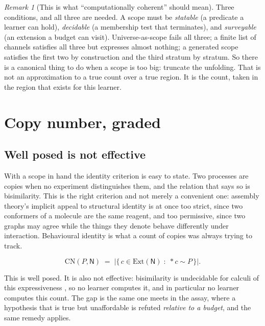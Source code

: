 \documentclass[11pt]{article}
\theoremstyle{plain}
\theoremstyle{definition}
\theoremstyle{remark}
\newtheorem{remark}[theorem]{Remark}
\newcommand{\Nsp}{\mathsf{N}}
\newcommand{\drop}[1]{*#1}
\newcommand{\CN}{\mathrm{CN}}
\newcommand{\bisim}{\sim}
\newcommand{\Ext}{\mathrm{Ext}}
\begin{document}
\begin{remark}[This is what ``computationally coherent'' should mean]
\label{sco:rem:coherent}
Three conditions, and all three are needed. A scope must be
\emph{statable} (a predicate a learner can hold), \emph{decidable} (a
membership test that terminates), and \emph{surveyable} (an extension a
budget can visit). Universe-as-scope fails all three; a finite list of
channels satisfies all three but expresses almost nothing; a generated
scope satisfies the first two by construction and the third stratum by
stratum. So there is a canonical thing to do when a scope is too big:
truncate the unfolding. That is not an approximation to a true count over
a true region. It is the count, taken in the region that exists for this
learner.
\end{remark}

\section{Copy number, graded}\label{sco:S4}

\subsection{Well posed is not effective}\label{sco:S4.1}

With a scope in hand the identity criterion is easy to state. Two
processes are copies when no experiment distinguishes them, and the
relation that says so is bisimilarity. This is the right criterion and not
merely a convenient one: assembly theory's implicit appeal to structural
identity is at once too strict, since two conformers of a molecule are the
same reagent, and too permissive, since two graphs may agree while the
things they denote behave differently under interaction. Behavioural
identity is what a count of copies was always trying to track.

\[
  \CN(P, \Nsp) \;=\; \bigl|\{\, c \in \Ext(\Nsp) \;:\; \drop{c} \bisim P \,\}\bigr|.
\]

This is well posed. It is also not effective: bisimilarity is undecidable
for calculi of this expressiveness \cite{sangiorgi}, so no learner
computes it, and in particular no learner computes this count. The gap is
the same one \cite{scientist} meets in the assay, where a hypothesis that
is true but unaffordable is refuted \emph{relative to a budget}, and the
same remedy applies.
\end{document}
